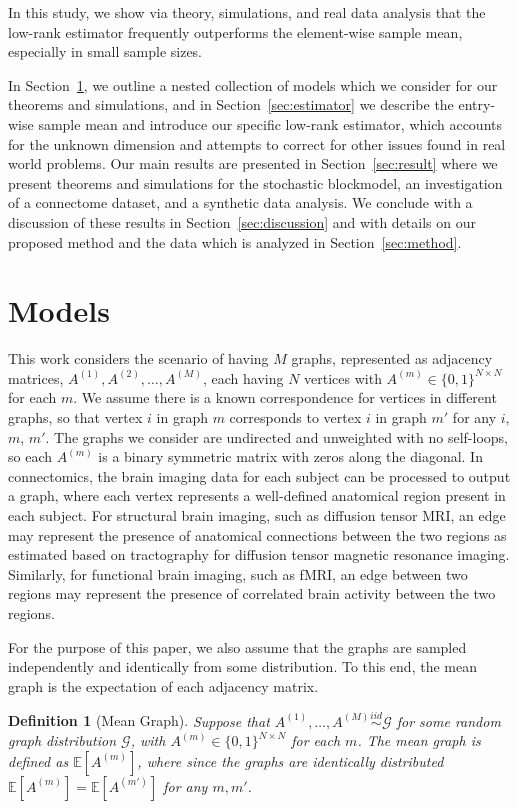 \documentclass[10pt,letterpaper]{article}
\newtheorem{definition}[fact]{Definition}
\newcommand{\Ex}{\mathbb{E}}
\begin{document}
In this study, we show via theory, simulations, and real data analysis that the low-rank estimator frequently outperforms the element-wise sample mean, especially in small sample sizes.


In Section~\ref{section:model}, we outline a nested collection of models which we consider for our theorems and simulations, and in Section~\ref{sec:estimator} we describe the entry-wise sample mean and introduce our specific low-rank estimator, which accounts for the unknown dimension and attempts to correct for other issues found in real world problems.
Our main results are presented in Section~\ref{sec:result} where we present theorems and simulations for the stochastic blockmodel, an investigation of a connectome dataset, and a synthetic data analysis. 
We conclude with a discussion of these results in Section~\ref{sec:discussion}  and with details on our proposed method and the data which is analyzed in Section~\ref{sec:method}.


\section{Models}
\label{section:model}
This work considers the scenario of having $M$ graphs, represented as adjacency matrices, $A^{(1)},A^{(2)},\dotsc,A^{(M)}$, each having $N$ vertices with $A^{(m)}\in\{0,1\}^{N\times N}$ for each $m$.
We assume there is a known correspondence for vertices in different graphs, so that vertex $i$ in graph $m$ corresponds to vertex $i$ in graph $m'$ for any $i$, $m$, $m'$.
The graphs we consider are undirected and unweighted with no self-loops, so each $A^{(m)}$ is a binary symmetric matrix with zeros along the diagonal. 
In connectomics, the  brain imaging data for each subject can be processed  to output a graph, where each vertex represents a well-defined anatomical region present in each subject.
For structural brain imaging, such as diffusion tensor MRI, an edge may represent the presence of anatomical connections between the two regions as estimated based on tractography for diffusion tensor magnetic resonance imaging.
Similarly, for functional brain imaging, such as fMRI, an edge between two regions may represent the presence of correlated brain activity between the two regions. 


For the purpose of this paper, we also assume that the graphs are sampled independently and identically from some distribution.
To this end, the mean graph is the expectation of each adjacency matrix.
\begin{definition}[Mean Graph]
Suppose that $A^{(1)},\dotsc,A^{(M)}\stackrel{iid}{\sim} \mathcal{G}$ for some random graph distribution $\mathcal{G}$, with $A^{(m)}\in\{0,1\}^{N\times N}$ for each $m$.
The {\em mean graph} is defined as $\Ex[A^{(m)}]$, where since the graphs are identically distributed $\Ex[A^{(m)}]=\Ex[A^{(m')}]$ for any $m,m'$.
\end{definition}
\end{document}
